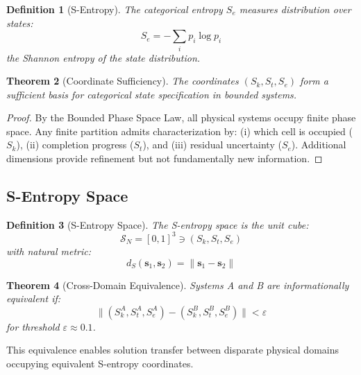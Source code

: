 \documentclass[twocolumn,amsmath,amssymb,aps,prl,superscriptaddress]{revtex4-2}
\newtheorem{theorem}{Theorem}[section]
\newtheorem{definition}[theorem]{Definition}
\newcommand{\Sspace}{\mathcal{S}}
\newcommand{\Sk}{S_k}
\newcommand{\St}{S_t}
\newcommand{\Se}{S_e}
\begin{document}
\begin{definition}[S-Entropy]
\label{def:se}
The categorical entropy $\Se$ measures distribution over states:
\begin{equation}
\boxed{\Se = -\sum_i p_i \log p_i}
\end{equation}
the Shannon entropy of the state distribution.
\end{definition}

\begin{theorem}[Coordinate Sufficiency]
\label{thm:sufficient}
The coordinates $(\Sk, \St, \Se)$ form a sufficient basis for categorical state specification in bounded systems.
\end{theorem}

\begin{proof}
By the Bounded Phase Space Law, all physical systems occupy finite phase space. Any finite partition admits characterization by: (i) which cell is occupied ($\Sk$), (ii) completion progress ($\St$), and (iii) residual uncertainty ($\Se$). Additional dimensions provide refinement but not fundamentally new information.
\end{proof}

\subsection{S-Entropy Space}

\begin{definition}[S-Entropy Space]
The S-entropy space is the unit cube:
\begin{equation}
\Sspace_N = [0, 1]^3 \ni (\Sk, \St, \Se)
\end{equation}
with natural metric:
\begin{equation}
d_S(\mathbf{s}_1, \mathbf{s}_2) = \|\mathbf{s}_1 - \mathbf{s}_2\|
\end{equation}
\end{definition}

\begin{theorem}[Cross-Domain Equivalence]
\label{thm:equiv}
Systems A and B are informationally equivalent if:
\begin{equation}
\|(\Sk^A, \St^A, \Se^A) - (\Sk^B, \St^B, \Se^B)\| < \varepsilon
\end{equation}
for threshold $\varepsilon \approx 0.1$.
\end{theorem}

This equivalence enables solution transfer between disparate physical domains occupying equivalent S-entropy coordinates.
\end{document}
